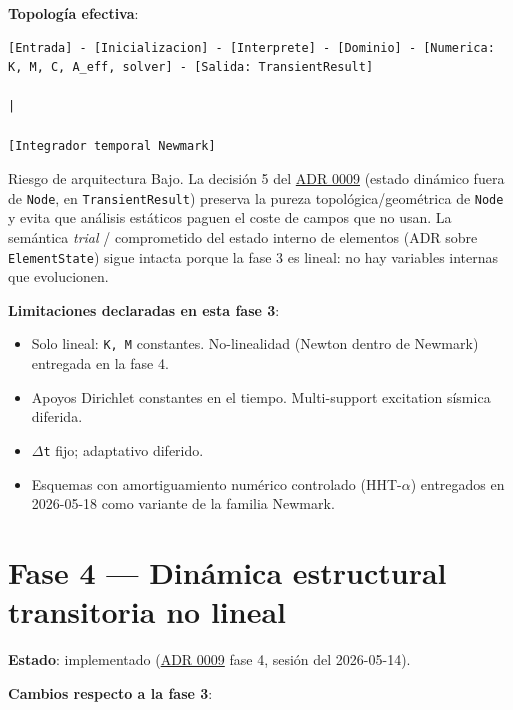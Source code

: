 \documentclass[11pt,oneside]{report}
\begin{document}
\textbf{Topología efectiva}:

\begin{lstlisting}
[Entrada] - [Inicializacion] - [Interprete] - [Dominio] - [Numerica: K, M, C, A_eff, solver] - [Salida: TransientResult]
                                                                                  |
                                                                  [Integrador temporal Newmark]

\end{lstlisting}

\begin{infobox}{Riesgo de arquitectura}
Bajo. La decisión 5 del \hyperref[adr:0009]{ADR 0009} (estado dinámico fuera de \texttt{Node}, en \texttt{TransientResult}) preserva la pureza topológica/geométrica de \texttt{Node} y evita que análisis estáticos paguen el coste de campos que no usan. La semántica \textit{trial} / comprometido del estado interno de elementos (ADR sobre \texttt{ElementState}) sigue intacta porque la fase 3 es lineal: no hay variables internas que evolucionen.
\end{infobox}

\textbf{Limitaciones declaradas en esta fase 3}:

\begin{itemize}
  \item Solo lineal: \texttt{K, M} constantes. No-linealidad (Newton dentro de Newmark) entregada en la fase 4.
  \item Apoyos Dirichlet constantes en el tiempo. Multi-support excitation sísmica diferida.
  \item \texttt{\ensuremath{\Delta}t} fijo; adaptativo diferido.
  \item Esquemas con amortiguamiento numérico controlado (HHT-\ensuremath{\alpha}) entregados en 2026-05-18 como variante de la familia Newmark.
\end{itemize}

\section{Fase 4 --- Dinámica estructural transitoria no lineal}

\textbf{Estado}: implementado (\hyperref[adr:0009]{ADR 0009} fase 4, sesión del 2026-05-14).

\textbf{Cambios respecto a la fase 3}:
\end{document}
